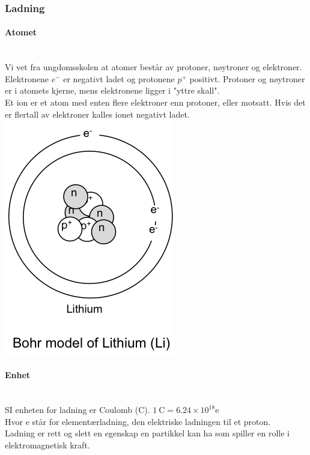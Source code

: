 \subsubsection{Ladning}
\paragraph{Atomet} \mbox{} \\
Vi vet fra ungdomsskolen at atomer består av protoner, nøytroner og elektroner.
Elektronene $e^-$ er negativt ladet og protonene $p^+$ positivt.
Protoner og nøytroner er i atomets kjerne, mens elektronene ligger i
"yttre skall".
\\
Et ion er et atom med enten flere elektroner enn protoner, eller motsatt.
Hvis det er flertall av elektroner kalles ionet negativt ladet.
\\
\includegraphics{./img/Li}

\paragraph{Enhet} \mbox{} \\
SI enheten for ladning er Coulomb (C). \hfill $\SI{1}{\coulomb} = 6.24 \times 10^{18}$e\\
Hvor e står for elementærladning, den elektriske ladningen til et proton.
\\
Ladning er rett og slett en egenskap en partikkel kan ha
som spiller en rolle i elektromagnetisk kraft.
